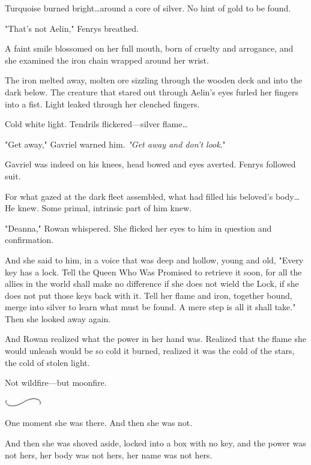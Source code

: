 Turquoise burned bright\ldots around a core of silver.
No hint of gold to be found.

"That's not Aelin," Fenrys breathed.

A faint smile blossomed on her full mouth, born of cruelty and arrogance, and she examined the iron chain wrapped around her wrist.

The iron melted away, molten ore sizzling through the wooden deck and into the dark below.
The creature that stared out through Aelin's eyes furled her fingers into a fist.
Light leaked through her clenched fingers.

Cold white light.
Tendrils flickered---silver flame\ldots{}

"Get away," Gavriel warned him.
\emph{"Get away and don't look}."

Gavriel was indeed on his knees, head bowed and eyes averted.
Fenrys followed suit.

For what gazed at the dark fleet assembled, what had filled his beloved's body\ldots He knew.
Some primal, intrinsic part of him knew.

"Deanna," Rowan whispered.
She flicked her eyes to him in question and confirmation.

And she said to him, in a voice that was deep and hollow, young and old, "Every key has a lock.
Tell the Queen Who Was Promised to retrieve it soon, for all the allies in the world shall make no difference if she does not wield the Lock, if she does not put those keys back with it.
Tell her flame and iron, together bound, merge into silver to learn what must be found.
A mere step is all it shall take."
Then she looked away again.

And Rowan realized what the power in her hand was.
Realized that the flame she would unleash would be so cold it burned, realized it was the cold of the stars, the cold of stolen light.

Not wildfire---but moonfire.

\begin{center}
	\includegraphics[width=0.65in,height=0.13in]{images/seperator}
\end{center}

One moment she was there.
And then she was not.

And then she was shoved aside, locked into a box with no key, and the power was not hers, her body was not hers, her name was not hers.

